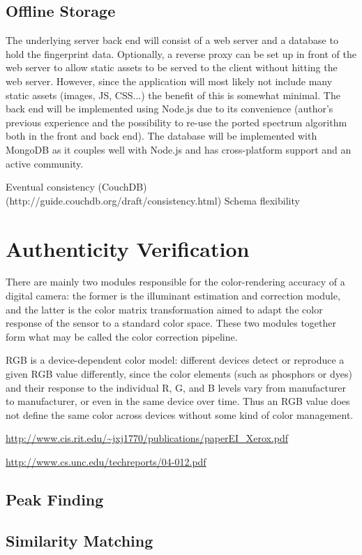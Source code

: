 \documentclass[thesis.tex]{subfiles}
\begin{document}
\subsection{Offline Storage}

The underlying server back end will consist of a web server and a database to hold the fingerprint data. Optionally, a reverse proxy can be set up in front of the web server to allow static assets to be served to the client without hitting the web server. However, since the application will most likely not include many static assets (images, JS, CSS...) the benefit of this is somewhat minimal. The back end will be implemented using Node.js due to its convenience (author's previous experience and the possibility to re-use the ported spectrum algorithm both in the front and back end). The database will be implemented with MongoDB as it couples well with Node.js and has cross-platform support and an active community.

Eventual consistency (CouchDB) (http://guide.couchdb.org/draft/consistency.html)
Schema flexibility

\section{Authenticity Verification}

\begin{comment}
\subsection{Color calibration}
\end{comment}
There are mainly two modules responsible for the color-rendering accuracy of a digital camera: the former is the illuminant estimation and correction module, and the latter is the color matrix transformation aimed to adapt the color response of the sensor to a standard color space. These two modules together form what may be called the color correction pipeline.

RGB is a device-dependent color model: different devices detect or reproduce a given RGB value differently, since the color elements (such as phosphors or dyes) and their response to the individual R, G, and B levels vary from manufacturer to manufacturer, or even in the same device over time. Thus an RGB value does not define the same color across devices without some kind of color management.

\url{http://www.cis.rit.edu/~jxj1770/publications/paperEI_Xerox.pdf}

\url{http://www.cs.unc.edu/techreports/04-012.pdf}

\subsection{Peak Finding}

\subsection{Similarity Matching}
\end{document}
